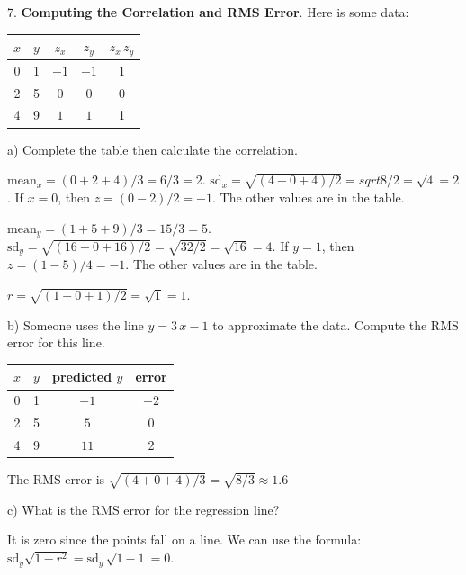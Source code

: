 \documentclass[10pt]{article}
\begin{document}
\vfill
\eject
    
7. \textbf{Computing the Correlation and RMS Error}.
Here is some data:
\begin{center}
{\setlength{\tabcolsep}{40pt}\begin{tabular}{cc|cc|c}
$x$ & $y$ & $z_x$ & $z_y$ & $z_x\,z_y$\\[2pt]\hline
0   & 1 & $-1$ & $-1$& 1\vphantom{\LARGE Y}\\[20pt]
2   & 5 & $0$  & $0$ & 0\\[20pt]
4   & 9 & $1$  & $1$ & 1\\[20pt]
\end{tabular}}
\end{center}
\hspace{10pt} a) Complete the table then calculate the correlation.

{\color{blue}
$\mbox{mean}_x = (0 + 2 + 4)/3 = 6/3 = 2$.  $\mbox{sd}_x=\sqrt{(4 + 0 + 4)/2}= sqrt{8/2}=\sqrt{4}=2$.
If $x=0$, then $z=(0-2)/2 = -1$.  The other values are in the table.
\medskip

$\mbox{mean}_y = (1 + 5 + 9)/3=15/3=5$.  $\mbox{sd}_y=\sqrt{(16 + 0 + 16)/2}=\sqrt{32/2}=\sqrt{16}=4$.
If $y=1$, then $z=(1-5)/4 = -1$.   The other values are in the table.
\medskip

$r=\sqrt{(1 + 0 + 1)/2}=\sqrt{1}=1$. }
\bigskip

\hspace{10pt} b) Someone uses the line $y=3\,x - 1$ to approximate the data.
Compute the RMS error for this line.


{\color{blue}
\begin{center}
\begin{tabular}{cccc}
$x$ & $y$ & predicted $y$ & error\\\hline
0 & 1 & $-1$ & $-2$\\
2 & 5 & $5$  & 0\\
4 & 9 & $11$ & 2\\
\end{tabular}
\end{center}

The RMS error is $\sqrt{(4 + 0 + 4)/3}=\sqrt{8/3}\approx 1.6$}
\bigskip

\hspace{10pt} c) What is the RMS error for the regression line?

{\color{blue} It is zero since the points fall on a line.  
We can use the formula:  $\mbox{sd}_y\sqrt{1-r^2} = \mbox{sd}_y\,\sqrt{1-1} = 0$.}
\vfill
\eject
\end{document}
